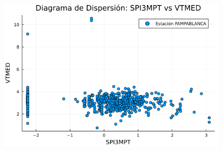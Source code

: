 \begin{figure}[htbp]
\begin{minipage}{0.32\textwidth}
    \includegraphics[width=\linewidth]{Capitulos/Scaterplot/PAMPABLANCA_SPI3MPT_vs_VTMED.png}
\end{minipage}

\vspace{0.5cm}  %


\end{figure}
